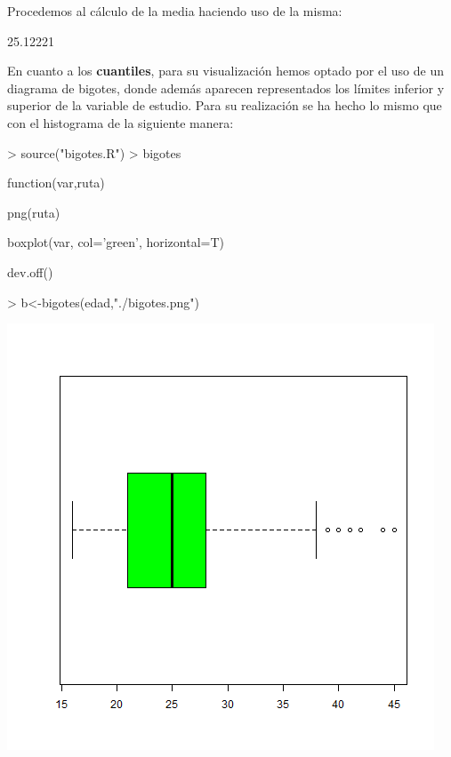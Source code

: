 \documentclass [a4paper] {article}
\begin{document}
\bigskip
Procedemos al c\'alculo de la media haciendo uso de la misma:
\begin{Schunk}
\begin{Soutput}
[1] 25.12221
\end{Soutput}
\end{Schunk}

\bigskip
En cuanto a los \textbf{cuantiles}, para su visualizaci\'on hemos optado por el uso
de un diagrama de bigotes, donde adem\'as aparecen representados los l\'imites inferior
y superior de la variable de estudio. Para su realizaci\'on se ha hecho lo mismo que con el 
histograma de la siguiente manera:
\begin{Schunk}
\begin{Sinput}
> source("bigotes.R")
> bigotes
\end{Sinput}
\begin{Soutput}
function(var,ruta) {
    png(ruta)
 
    boxplot(var, col='green', horizontal=T) 

    dev.off()
}
\end{Soutput}
\end{Schunk}

\begin{Schunk}
\begin{Sinput}
> b<-bigotes(edad,"./bigotes.png")
\end{Sinput}
\end{Schunk}
\includegraphics[width=\textwidth]{bigotes}
\end{document}
